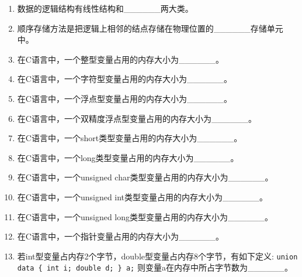 \documentclass[a4paper,12pt]{article}
\begin{document}
\begin{enumerate}
	\item 数据的逻辑结构有线性结构和\_\_\_\_\_\_两大类。
	      \vspace{0.3cm}

	\item 顺序存储方法是把逻辑上相邻的结点存储在物理位置的\_\_\_\_\_\_存储单元中。
	      \vspace{0.3cm}

	\item 在C语言中，一个整型变量占用的内存大小为\_\_\_\_\_\_。
	      \vspace{0.3cm}

	\item 在C语言中，一个字符型变量占用的内存大小为\_\_\_\_\_\_。
	      \vspace{0.3cm}

	\item 在C语言中，一个浮点型变量占用的内存大小为\_\_\_\_\_\_。
	      \vspace{0.3cm}

	\item 在C语言中，一个双精度浮点型变量占用的内存大小为\_\_\_\_\_\_。
	      \vspace{0.3cm}

	\item 在C语言中，一个short类型变量占用的内存大小为\_\_\_\_\_\_。
	      \vspace{0.3cm}

	\item 在C语言中，一个long类型变量占用的内存大小为\_\_\_\_\_\_。
	      \vspace{0.3cm}

	\item 在C语言中，一个unsigned char类型变量占用的内存大小为\_\_\_\_\_\_。
	      \vspace{0.3cm}

	\item 在C语言中，一个unsigned int类型变量占用的内存大小为\_\_\_\_\_\_。
	      \vspace{0.3cm}

	\item 在C语言中，一个unsigned long类型变量占用的内存大小为\_\_\_\_\_\_。
	      \vspace{0.3cm}

	\item 在C语言中，一个指针变量占用的内存大小为\_\_\_\_\_\_。
	      \vspace{0.3cm}

	\item 若int型变量占内存2个字节，double型变量占内存8个字节，有如下定义: \texttt{union data \{ int i; double d; \} a;} 则变量a在内存中所占字节数为\_\_\_\_\_\_。
	      \vspace{0.3cm}


\end{enumerate}
\end{document}
